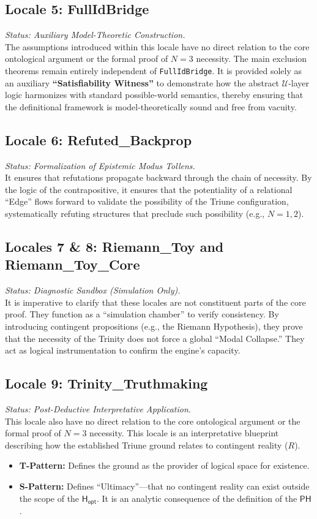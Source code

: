 \documentclass[a4paper, 11pt]{article}
\theoremstyle{plain}
\theoremstyle{definition}
\newcommand{\U}{\mathcal{U}}               %
\newcommand{\Hopt}{\mathsf{H_{opt}}}       %
\newcommand{\PH}{\mathsf{PH}}             %
\begin{document}
\subsection{Locale 5: FullIdBridge}
\textit{Status: Auxiliary Model-Theoretic Construction.} \\
The assumptions introduced within this locale have no direct relation to the core ontological argument or the formal proof of $N=3$ necessity. The main exclusion theorems remain entirely independent of \texttt{FullIdBridge}. It is provided solely as an auxiliary \textbf{``Satisfiability Witness''} to demonstrate how the abstract $\U$-layer logic harmonizes with standard possible-world semantics, thereby ensuring that the definitional framework is model-theoretically sound and free from vacuity.

\subsection{Locale 6: Refuted\_Backprop}
\textit{Status: Formalization of Epistemic Modus Tollens.} \\
It ensures that refutations propagate backward through the chain of necessity. By the logic of the contrapositive, it ensures that the potentiality of a relational ``Edge'' flows forward to validate the possibility of the Triune configuration, systematically refuting structures that preclude such possibility (e.g., $N=1, 2$).

\subsection{Locales 7 \& 8: Riemann\_Toy and Riemann\_Toy\_Core}
\textit{Status: Diagnostic Sandbox (Simulation Only).} \\
It is imperative to clarify that these locales are not constituent parts of the core proof. They function as a ``simulation chamber'' to verify consistency. By introducing contingent propositions (e.g., the Riemann Hypothesis), they prove that the necessity of the Trinity does not force a global ``Modal Collapse.'' They act as logical instrumentation to confirm the engine's capacity.

\subsection{Locale 9: Trinity\_Truthmaking}
\textit{Status: Post-Deductive Interpretative Application.} \\
This locale also have no direct relation to the core ontological argument or the formal proof of $N=3$ necessity. This locale is an interpretative blueprint describing how the established Triune ground relates to contingent reality ($R$).
\begin{itemize}
    \item \textbf{T-Pattern:} Defines the ground as the provider of logical space for existence.
    \item \textbf{S-Pattern:} Defines ``Ultimacy''—that no contingent reality can exist outside the scope of the $\Hopt$. It is an analytic consequence of the definition of the $\PH$.
\end{itemize}
\end{document}
